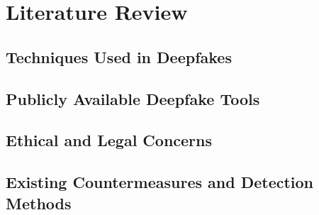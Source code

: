 
\chapter{Literature Review}\label{chapter:literature}

\section{Techniques Used in Deepfakes}\label{chapter:techniques}
\section{Publicly Available Deepfake Tools}\label{chapter:publicly}
\section{Ethical and Legal Concerns}\label{chapter:legal}
\section{Existing Countermeasures and Detection Methods}\label{chapter:countermeasures}
